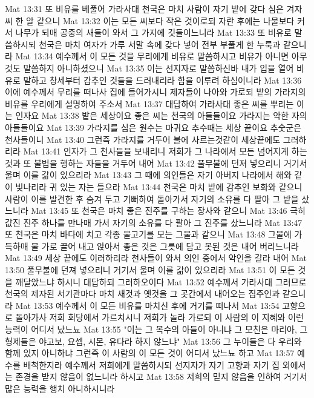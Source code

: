 Mat 13:31  또 비유를 베풀어 가라사대 천국은 마치 사람이 자기 밭에 갖다 심은 겨자씨 한 알 같으니
Mat 13:32  이는 모든 씨보다 작은 것이로되 자란 후에는 나물보다 커서 나무가 되매 공중의 새들이 와서 그 가지에 깃들이느니라
Mat 13:33  또 비유로 말씀하시되 천국은 마치 여자가 가루 서말 속에 갖다 넣어 전부 부풀게 한 누룩과 같으니라
Mat 13:34  예수께서 이 모든 것을 무리에게 비유로 말씀하시고 비유가 아니면 아무 것도 말씀하지 아니하셨으니
Mat 13:35  이는 선지자로 말씀하신바 내가 입을 열어 비유로 말하고 창세부터 감추인 것들을 드러내리라 함을 이루려 하심이니라
Mat 13:36  이에 예수께서 무리를 떠나사 집에 들어가시니 제자들이 나아와 가로되 밭의 가라지의 비유를 우리에게 설명하여 주소서
Mat 13:37  대답하여 가라사대 좋은 씨를 뿌리는 이는 인자요
Mat 13:38  밭은 세상이요 좋은 씨는 천국의 아들들이요 가라지는 악한 자의 아들들이요
Mat 13:39  가라지를 심은 원수는 마귀요 추수때는 세상 끝이요 추숫군은 천사들이니
Mat 13:40  그런즉 가라지를 거두어 불에 사르는것같이 세상끝에도 그러하리라
Mat 13:41  인자가 그 천사들을 보내리니 저희가 그 나라에서 모든 넘어지게 하는 것과 또 불법을 행하는 자들을 거두어 내어
Mat 13:42  풀무불에 던져 넣으리니 거기서 울며 이를 갊이 있으리라
Mat 13:43  그 때에 의인들은 자기 아버지 나라에서 해와 같이 빛나리라 귀 있는 자는 들으라
Mat 13:44  천국은 마치 밭에 감추인 보화와 같으니 사람이 이를 발견한 후 숨겨 두고 기뻐하여 돌아가서 자기의 소유를 다 팔아 그 밭을 샀느니라
Mat 13:45  또 천국은 마치 좋은 진주를 구하는 장사와 같으니
Mat 13:46  극히 값진 진주 하나를 만나매 가서 자기의 소유를 다 팔아 그 진주를 샀느니라
Mat 13:47  또 천국은 마치 바다에 치고 각종 물고기를 모는 그물과 같으니
Mat 13:48  그물에 가득하매 물 가로 끌어 내고 앉아서 좋은 것은 그릇에 담고 못된 것은 내어 버리느니라
Mat 13:49  세상 끝에도 이러하리라 천사들이 와서 의인 중에서 악인을 갈라 내어
Mat 13:50  풀무불에 던져 넣으리니 거기서 울며 이를 갊이 있으리라
Mat 13:51  이 모든 것을 깨달았느냐 하시니 대답하되 그러하오이다
Mat 13:52  예수께서 가라사대 그러므로 천국의 제자된 서기관마다 마치 새것과 옛것을 그 곳간에서 내어오는 집주인과 같으니라
Mat 13:53  예수께서 이 모든 비유를 마치신 후에 거기를 떠나서
Mat 13:54  고향으로 돌아가사 저희 회당에서 가르치시니 저희가 놀라 가로되 이 사람의 이 지혜와 이런 능력이 어디서 났느뇨
Mat 13:55  "이는 그 목수의 아들이 아니냐 그 모친은 마리아, 그 형제들은 야고보, 요셉, 시몬, 유다라 하지 않느냐"
Mat 13:56  그 누이들은 다 우리와 함께 있지 아니하냐 그런즉 이 사람의 이 모든 것이 어디서 났느뇨 하고
Mat 13:57  예수를 배척한지라 예수께서 저희에게 말씀하시되 선지자가 자기 고향과 자기 집 외에서는 존경을 받지 않음이 없느니라 하시고
Mat 13:58  저희의 믿지 않음을 인하여 거기서 많은 능력을 행치 아니하시니라
